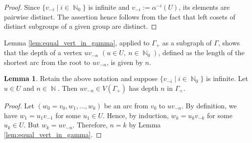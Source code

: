 \documentclass{article}
\DeclareMathOperator\bbN{\mathbb{N}}
\theoremstyle{definition}
\newtheorem{lemma}[theorem]{Lemma}
\begin{document}
\begin{proof}
Since $\{v_{-i}\mid i\in\bbN_{0}\}$ is infinite and $v_{-i}:=\alpha^{-i}(U)$, its elements are pairwise distinct. The assertion hence follows from the fact that left cosets of distinct subgroups of a given group are distinct.
\end{proof}

Lemma \ref{lem:equal_vert_in_gamma}, applied to $\Gamma_{+}$ as a subgraph of $\Gamma$, shows that the depth of a vertex $uv_{-n}$ $(u\in U,\ n\in\bbN_{0})$, defined as the length of the shortest arc from the root to $uv_{-n}$, is given by $n$.

\begin{lemma}\label{lem:gamma_+_depth}
Retain the above notation and suppose $\{v_{-i}\mid i\in\bbN_{0}\}$ is infinite. Let $u\in U$ and $n\in\bbN$. Then $uv_{-n}\in V(\Gamma_{+})$ has depth $n$ in $\Gamma_{+}$.
\end{lemma}

\begin{proof}
Let $(w_{0}=v_{0},w_{1},\ldots,w_{k})$ be an arc from $v_{0}$ to $uv_{-n}$. By definition, we have $w_{1}=u_{1}v_{-1}$ for some $u_{1}\in U$. Hence, by induction, $w_{k}=u_{k}v_{-k}$ for some $u_{k}\in U$. But $w_{k}=uv_{-n}$. Therefore, $n=k$ by Lemma \ref{lem:equal_vert_in_gamma}.
\end{proof}
\end{document}
